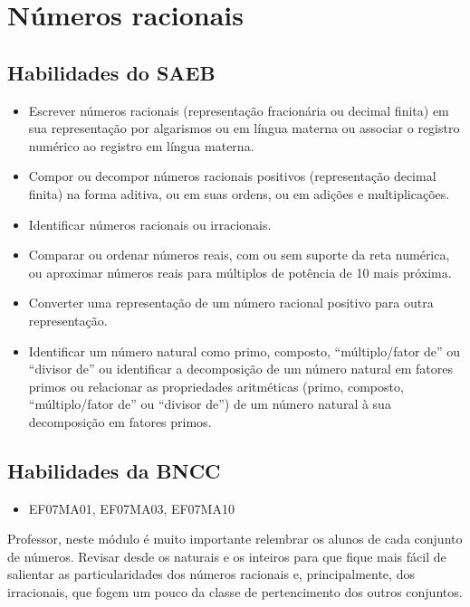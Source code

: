 
\chapter{Números racionais}

\section{Habilidades do SAEB }
\begin{itemize}
\item Escrever números racionais (representação
fracionária ou decimal finita) em sua representação por algarismos ou em
língua materna ou associar o registro numérico ao registro em língua
materna.
\item
  Compor ou decompor números racionais positivos (representação decimal
  finita) na forma aditiva, ou em suas ordens, ou em adições e
  multiplicações.
\item
  Identificar números racionais ou irracionais.
\item
  Comparar ou ordenar números reais, com ou sem suporte da reta
  numérica, ou aproximar números reais para múltiplos de potência de 10
  mais próxima.
\item
  Converter uma representação de um número racional positivo para outra
  representação.
\item
  Identificar um número natural como primo, composto, ``múltiplo/fator
  de'' ou ``divisor de'' ou identificar a decomposição de um número
  natural em fatores primos ou relacionar as propriedades aritméticas
  (primo, composto, ``múltiplo/fator de'' ou ``divisor de'') de um
  número natural à sua decomposição em fatores primos.
\end{itemize}

\section{Habilidades da BNCC }
\begin{itemize}
\item EF07MA01, EF07MA03, EF07MA10
\end{itemize}

Professor, neste módulo é muito importante relembrar os alunos de cada
conjunto de números. Revisar desde os naturais e os inteiros para que
fique mais fácil de salientar as particularidades dos números racionais
e, principalmente, dos irracionais, que fogem um pouco da classe de
pertencimento dos outros conjuntos.

